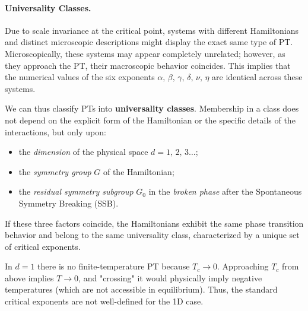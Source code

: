 \paragraph{Universality Classes.}
Due to scale invariance at the critical point, systems with different Hamiltonians and distinct microscopic descriptions might display the exact same type of PT. Microscopically, these systems may appear completely unrelated; however, as they approach the PT, their macroscopic behavior coincides. This implies that the numerical values of the six exponents \(\alpha,\,\beta,\,\gamma,\,\delta,\,\nu,\,\eta\) are identical across these systems.

We can thus classify PTs into \textbf{universality classes}. Membership in a class does not depend on the explicit form of the Hamiltonian or the specific details of the interactions, but only upon:
\begin{itemize}
    \item the \textit{dimension} of the physical space \(d=1,\,2,\,3\dots\);
    \item the \textit{symmetry group} \(G\) of the Hamiltonian;
    \item the \textit{residual symmetry subgroup} \(G_0\) in the \textit{broken phase} after the Spontaneous Symmetry Breaking (SSB).
\end{itemize}
If these three factors coincide, the Hamiltonians exhibit the same phase transition behavior and belong to the same universality class, characterized by a unique set of critical exponents.

\begin{remark}
    In \(d=1\) there is no finite-temperature PT because \(T_c \to 0\). Approaching \(T_c\) from above implies \(T \to 0\), and "crossing" it would physically imply negative temperatures (which are not accessible in equilibrium). Thus, the standard critical exponents are not well-defined for the 1D case.
\end{remark}